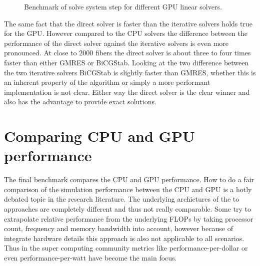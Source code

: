 \documentclass[a4paper,11pt]{kth-mag}
\begin{document}
\begin{figure}
  \centering
  \caption{Benchmark of solve system step for different GPU linear solvers.}
  \label{fig:bench_cuda_solvers}
\end{figure}

The same fact that the direct solver is faster than the iterative solvers holds true for the GPU. However compared to the CPU solvers the difference between the performance of the direct solver against the iterative solvers is even more pronounced. At close to $2000$ fibers the direct solver is about three to four times faster than either GMRES or BiCGStab. Looking at the two difference between the two iterative solvers BiCGStab is slightly faster than GMRES, whether this is an inherent property of the algorithm or simply a more performant implementation is not clear. Either way the direct solver is the clear winner and also has the advantage to provide exact solutions.

\section{Comparing CPU and GPU performance}

The final benchmark compares the CPU and GPU performance. How to do a fair comparison of the simulation performance between the CPU and GPU is a hotly debated topic in the research literature. The underlying archictures of the to approaches are completely different and thus not really comparable. Some try to extrapolate relative performance from the underlying FLOPs by taking processor count, frequency and memory bandwidth into account, however because of integrate hardware details this approach is also not applicable to all scenarios. Thus in the super computing community metrics like performance-per-dollar or even performance-per-watt have become the main focus.
\end{document}
